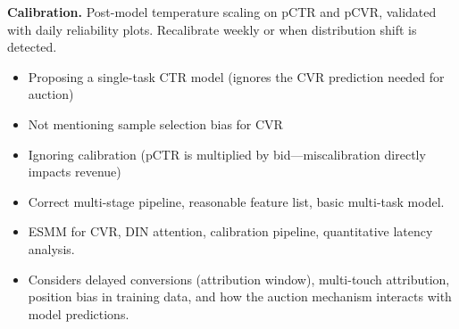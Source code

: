 \begin{interviewq}
\textbf{Calibration.} Post-model temperature scaling on pCTR and pCVR, validated with daily reliability plots. Recalibrate weekly or when distribution shift is detected.

\redflags
\begin{itemize}
    \item Proposing a single-task CTR model (ignores the CVR prediction needed for auction)
    \item Not mentioning sample selection bias for CVR
    \item Ignoring calibration (pCTR is multiplied by bid---miscalibration directly impacts revenue)
\end{itemize}


\goodgreat
\begin{itemize}
    \item {} Correct multi-stage pipeline, reasonable feature list, basic multi-task model.
    \item {} ESMM for CVR, DIN attention, calibration pipeline, quantitative latency analysis.
    \item {} Considers delayed conversions (attribution window), multi-touch attribution, position bias in training data, and how the auction mechanism interacts with model predictions.
\end{itemize}

\end{interviewq}

